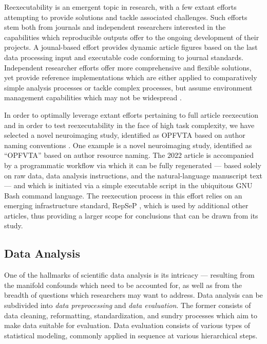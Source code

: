 Reexecutability is an emergent topic in research, with a few extant efforts attempting to provide solutions and tackle associated challenges.
Such efforts stem both from journals and independent researchers interested in the capabilities which reproducible outputs offer to the ongoing development of their projects.
A jounal-based effort \cite{eliferep} provides dynamic article figures based on the last data processing input and executable code conforming to journal standards.
Independent researcher efforts offer more comprehensive and flexible solutions, yet provide reference implementations which are either applied to comparatively simple analysis processes \cite{datalad} or tackle complex processes, but assume environment management capabilities which may not be widespread \cite{repsep}.

In order to optimally leverage extant efforts pertaining to full article reexecution and in order to test reexecutability in the face of high task complexity, we have selected a novel neuroimaging study, identified as OPFVTA based on author naming conventions \cite{opfvta}.
One example is a novel neuroimaging study, identified as “OPFVTA” \cite{opfvta} based on author resource naming.
The 2022 article is accompanied by a programmatic workflow via which it can be fully regenerated — based solely on raw data, data analysis instructions, and the natural-language manuscript text — and which is initiated via a simple executable script in the ubiquitous GNU Bash \cite{bash} command language.
The reexecution process in this effort relies on an emerging infrastructure standard, RepSeP \cite{repsep}, which is used by additional other articles, thus providing a larger scope for conclusions that can be drawn from its study.


\subsection{Data Analysis}

One of the hallmarks of scientific data analysis is its intricacy — resulting from the manifold confounds which need to be accounted for, as well as from the breadth of questions which researchers may want to address.
Data analysis can be subdivided into \emph{data preprocessing} and \emph{data evaluation}.
The former consists of data cleaning, reformatting, standardization, and sundry processes which aim to make data suitable for evaluation.
Data evaluation consists of various types of statistical modeling, commonly applied in sequence at various hierarchical steps.

